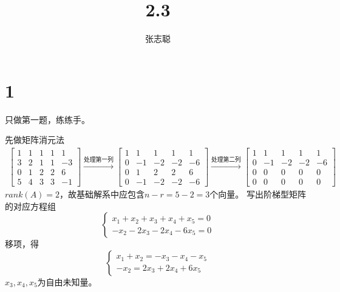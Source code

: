 \documentclass{article}
\begin{document}
\title{2.3}
\author{张志聪}
\maketitle

\section*{1}

只做第一题，练练手。

先做矩阵消元法
\begin{align*}
  \begin{bmatrix}
    1 & 1 & 1 & 1 & 1  \\
    3 & 2 & 1 & 1 & -3 \\
    0 & 1 & 2 & 2 & 6  \\
    5 & 4 & 3 & 3 & -1
  \end{bmatrix}
  \xrightarrow{\text{处理第一列}}
  \begin{bmatrix}
    1 & 1  & 1  & 1  & 1  \\
    0 & -1 & -2 & -2 & -6 \\
    0 & 1  & 2  & 2  & 6  \\
    0 & -1 & -2 & -2 & -6
  \end{bmatrix}
  \xrightarrow{\text{处理第二列}}
  \begin{bmatrix}
    1 & 1  & 1  & 1  & 1  \\
    0 & -1 & -2 & -2 & -6 \\
    0 & 0  & 0  & 0  & 0  \\
    0 & 0  & 0  & 0  & 0
  \end{bmatrix}
\end{align*}
$rank(A) = 2$，故基础解系中应包含$n - r = 5 - 2 = 3$个向量。
写出阶梯型矩阵的对应方程组
\begin{equation*}
  \begin{cases*}
    x_1 + x_2 + x_3 + x_4 + x_5 = 0 \\
    -x_2 - 2x_3 -2 x_4 -6 x_5 = 0
  \end{cases*}
\end{equation*}
移项，得
\begin{equation*}
  \begin{cases*}
    x_1 + x_2 = - x_3 - x_4 - x_5 \\
    -x_2 = 2x_3 + 2 x_4 + 6 x_5
  \end{cases*}
\end{equation*}
$x_3,x_4,x_5$为自由未知量。
\end{document}
